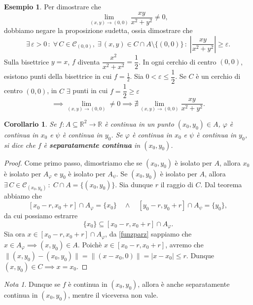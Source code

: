 \documentclass{article}
\theoremstyle{plain}
\newtheorem{cor}{Corollario}
\theoremstyle{definition}
\newtheorem{exmp}{Esempio}[section]
\theoremstyle{remark}
\newtheorem{note}{Nota}
\begin{document}
\begin{exmp}
    Per dimostrare che 
    \[\lim_{(x,y)\to(0,0)}\dfrac{xy}{x^2+y^2}\neq0,\]
    dobbiamo negare la proposizione sudetta, ossia dimostrare che
    \[\exists\,\varepsilon>0\,:\;\forall\, C\in\mathcal{C}_{(0,0)},\; \exists\,(x,y)\in C\cap A\setminus\{(0,0)\}\,:\;\left|\dfrac{xy}{x^2+y^2}\right|\geq\varepsilon.\]
    Sulla bisettrice $y=x$, $f$ diventa $\dfrac{x^2}{x^2+x^2}=\dfrac{1}{2}$. In ogni cerchio di centro $(0,0)$, esistono punti della bisettrice in cui $f=\frac{1}{2}$.
    Sia $0<\varepsilon\leq\dfrac{1}{2}$. Se $C$ è un cerchio di centro $(0,0)$, in $C$ $\exists$ punti in cui $f=\dfrac{1}{2}\geq\varepsilon$
    \[\implies\lim_{(x,y)\to(0,0)}\neq0\implies\nexists\lim_{(x,y)\to(0,0)}\dfrac{xy}{x^2+y^2}.\]
\end{exmp}

\vspace{10pt}

\begin{bxthm}
\begin{cor}
Se $f:A\subseteq\mathbb{R}^2\to\mathbb{R}$ è continua in un punto $(x_0,y_0)\in A$, $\varphi$ è continua in $x_0$ e $\psi$ è continua in $y_0$.
Se $\varphi$ è continua in $x_0$ e $\psi$ è continua in $y_0$, si dice che $f$ è \textbf{separatamente continua} in $(x_0,y_0)$.
\end{cor}
\end{bxthm}
\begin{proof}
    Come primo passo, dimostriamo che se $(x_0,y_0)$ è isolato per $A$, allora $x_0$ è isolato per $A_\varphi$ e $y_0$ è isolato per $A_\psi$.
    Se $(x_0,y_0)$ è isolato per $A$, allora $\exists\,C\in\mathcal{C}_{(x_0,y_0)}\,:\;C\cap A=\{(x_0,y_0)\}$.
    Sia dunque $r$ il raggio di $C$.
    Dal teorema abbiamo che 
    \[[x_0-r,x_0+r]\cap A_\varphi=\{x_0\}\quad\land\quad[y_0-r,y_0+r]\cap A_\psi=\{y_0\},\]
    da cui possiamo estrarre
    \[\{x_0\}\subseteq[x_0-r,x_0+r]\cap A_\varphi.\]
    Sia ora $x\in[x_0-r,x_0+r]\cap A_\varphi$, da \ref{funzparz} sappiamo che $x\in A_\varphi\implies(x,y_0)\in A$.
    Poichè $x\in[x_0-r,x_0+r]$, avremo che $\| (x,y_0)-(x_0,y_0) \|=\|(x-x_0,0)\|=|x-x_0|\leq r$.
    Dunque $(x,y_0)\in C\implies x=x_0$.
\end{proof}

\vspace{10pt}

\begin{note}
    Dunque se $f$ è continua in $(x_0,y_0)$, allora è anche separatamente continua in $(x_0,y_0)$, mentre il viceversa non vale.
\end{note}
\end{document}
